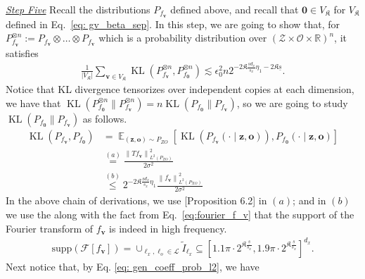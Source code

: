 \documentclass[11pt]{article}
\newcommand{\bz}{\mathbf z}
\newcommand{\bv}{\mathbf v}
\newcommand{\bo}{\mathbf o}
\newcommand{\calZ}{\mathcal{Z}}
\newcommand{\calF}{\mathcal{F}}
\newcommand{\calO}{\mathcal{O}}
\newcommand{\calL}{\mathcal{L}}
\newcommand{\bl}{{\boldsymbol\ell}}
\newcommand{\0}{\mathbf{0}}
\DeclareMathOperator{\E}{\mathbb{E}}
\begin{document}
\begin{appendix}
\vspace{3mm}
\noindent
\underline{\emph{Step Five}}
Recall the distributions $P_{f_\bv}$ defined above, and recall that $\boldsymbol{0}\in V_\mathfrak{K}$ for $V_\mathfrak{K}$ defined in Eq.~\eqref{eq: gv_beta_sep}. 
In this step, we are going to show that, for $P_{f_\bv}^{\otimes n} := P_{f_\bv} \otimes \dots \otimes P_{f_\bv}$ which is a probability distribution over $(\calZ\times \calO \times\mathbb{R})^{n}$, it satisfies
\begin{align*}
    \frac{1}{|V_\mathfrak{K}|}\sum_{\bv\in V_\mathfrak{K}}\operatorname{KL}\left(P_{f_\bv}^{\otimes n}, P_{f_{\boldsymbol{0}}}^{\otimes n}   \right) \lesssim \epsilon_0^2 n  2^{-2\mathfrak{K}\frac{\underline{s}d_x}{s_x} \eta_1 -2\mathfrak{K}\underline{s}} .
\end{align*}
Notice that KL divergence tensorizes over independent copies at each dimension, we have that  $\operatorname{KL}(P_{f_{\boldsymbol{0}}}^{\otimes n} \| P_{f_\bv}^{\otimes n}) = n \operatorname{KL}(P_{f_{\boldsymbol{0}}} \| P_{f_\bv})$, so we are going to study $\operatorname{KL}(P_{f_{\boldsymbol{0}}} \| P_{f_\bv})$ as follows.
\begin{align}\label{eq:single_kl}
    \operatorname{KL}\left( P_{f_\bv}, P_{f_{\boldsymbol{0}}} \right) &= \E_{(\bz,\bo) \sim P_{ZO}}\left[ \operatorname{KL}\left(  P_{f_\bv} \left(\cdot \mid 
    \bz,\bo \right) \right) , P_{f_{\boldsymbol{0}}} \left( \cdot \mid \bz,\bo \right)\right] \nonumber\\
    &\stackrel{(a)}{=} \frac{ \left\|T f_{\bv}\right\|_{L^2\left( P_{ZO} \right)}^2}{2 \sigma^2} \nonumber\\
    &\stackrel{(b)}{\leq} 2^{-2\mathfrak{K}\frac{\underline{s}d_x}{s_x} \eta_1} \frac{ \left\|f_{\bv}\right\|_{L^2(P_{XO})}^2}{2 \sigma^2} 
\end{align}
In the above chain of derivations, 
we use \cite{blanchard2018optimal}[Proposition 6.2] in $(a)$; and in $(b)$ we use the  along with the fact from Eq.~\eqref{eq:fourier_f_v} that the support of the Fourier transform of $f_{\bv}$ is indeed in high frequency.
\begin{align*}
    \mathrm{supp}(\calF[f_{\bv}]) = \cup_{\bl_x, \bl_o \in \calL} \tilde{I}_{\bl_x} \subseteq \left[ 1.1 \pi \cdot 2^{\mathfrak{K}\frac{\underline{s}}{s_x}}, 1.9\pi \cdot 2^{\mathfrak{K}\frac{\underline{s}}{s_x}} \right]^{d_x}.
\end{align*}
Next notice that, by Eq. \eqref{eq: gen_coeff_prob_l2}, we have
\begin{small}

\end{small}
\end{appendix}
\end{document}
